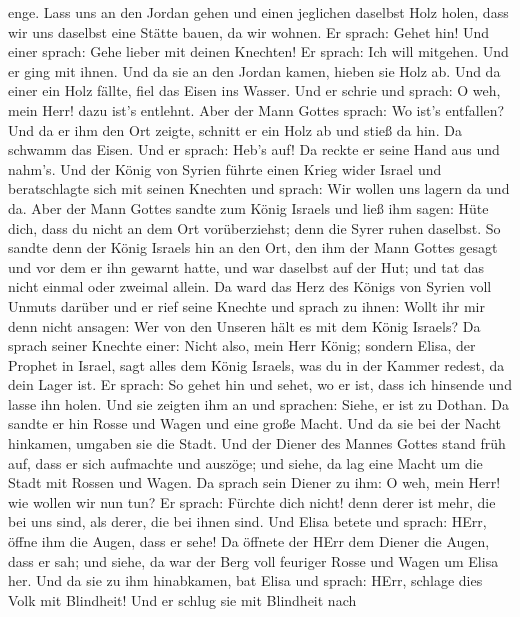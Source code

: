 enge.  Lass uns an den Jordan gehen und einen jeglichen
daselbst Holz holen, dass wir uns daselbst eine Stätte bauen, da wir
wohnen. Er sprach: Gehet hin!  Und einer sprach: Gehe lieber
mit deinen Knechten! Er sprach: Ich will mitgehen.  Und er
ging mit ihnen. Und da sie an den Jordan kamen, hieben sie Holz ab.
 Und da einer ein Holz fällte, fiel das Eisen ins Wasser.
Und er schrie und sprach: O weh, mein Herr! dazu ist's entlehnt.
 Aber der Mann Gottes sprach: Wo ist's entfallen? Und da er
ihm den Ort zeigte, schnitt er ein Holz ab und stieß da hin. Da schwamm
das Eisen.  Und er sprach: Heb's auf! Da reckte er seine
Hand aus und nahm's.  Und der König von Syrien führte einen
Krieg wider Israel und beratschlagte sich mit seinen Knechten und
sprach: Wir wollen uns lagern da und da.  Aber der Mann
Gottes sandte zum König Israels und ließ ihm sagen: Hüte dich, dass du
nicht an dem Ort vorüberziehst; denn die Syrer ruhen daselbst.
 So sandte denn der König Israels hin an den Ort, den ihm
der Mann Gottes gesagt und vor dem er ihn gewarnt hatte, und war
daselbst auf der Hut; und tat das nicht einmal oder zweimal allein.
 Da ward das Herz des Königs von Syrien voll Unmuts darüber
und er rief seine Knechte und sprach zu ihnen: Wollt ihr mir denn nicht
ansagen: Wer von den Unseren hält es mit dem König Israels?
 Da sprach seiner Knechte einer: Nicht also, mein Herr
König; sondern Elisa, der Prophet in Israel, sagt alles dem König
Israels, was du in der Kammer redest, da dein Lager ist. 
Er sprach: So gehet hin und sehet, wo er ist, dass ich hinsende und
lasse ihn holen. Und sie zeigten ihm an und sprachen: Siehe, er ist zu
Dothan.  Da sandte er hin Rosse und Wagen und eine große
Macht. Und da sie bei der Nacht hinkamen, umgaben sie die Stadt.
 Und der Diener des Mannes Gottes stand früh auf, dass er
sich aufmachte und auszöge; und siehe, da lag eine Macht um die Stadt
mit Rossen und Wagen. Da sprach sein Diener zu ihm: O weh, mein Herr!
wie wollen wir nun tun?  Er sprach: Fürchte dich nicht!
denn derer ist mehr, die bei uns sind, als derer, die bei ihnen sind.
 Und Elisa betete und sprach: HErr, öffne ihm die Augen,
dass er sehe! Da öffnete der HErr dem Diener die Augen, dass er sah; und
siehe, da war der Berg voll feuriger Rosse und Wagen um Elisa her.
 Und da sie zu ihm hinabkamen, bat Elisa und sprach: HErr,
schlage dies Volk mit Blindheit! Und er schlug sie mit Blindheit nach
